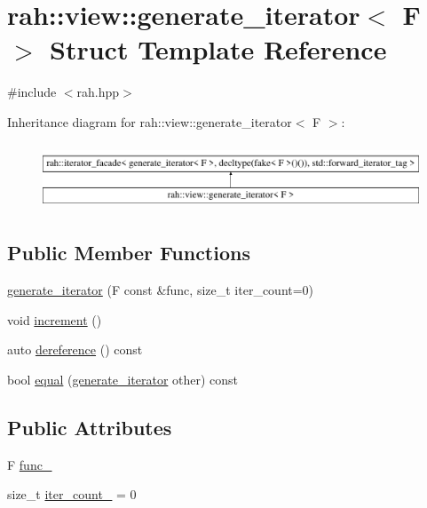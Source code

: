 \hypertarget{structrah_1_1view_1_1generate__iterator}{}\section{rah\+::view\+::generate\+\_\+iterator$<$ F $>$ Struct Template Reference}
\label{structrah_1_1view_1_1generate__iterator}


{\ttfamily \#include $<$rah.\+hpp$>$}

Inheritance diagram for rah\+::view\+::generate\+\_\+iterator$<$ F $>$\+:\begin{figure}[H]
\begin{center}
\leavevmode
\includegraphics[height=1.975309cm]{structrah_1_1view_1_1generate__iterator}
\end{center}
\end{figure}
\subsection*{Public Member Functions}
\begin{DoxyCompactItemize}
\item 
\mbox{\hyperlink{structrah_1_1view_1_1generate__iterator_af458a280a6089691435a8ad71380fca9}{generate\+\_\+iterator}} (F const \&func, size\+\_\+t iter\+\_\+count=0)
\item 
void \mbox{\hyperlink{structrah_1_1view_1_1generate__iterator_aeb0fc0db74bda811fe5d7cb8c6efe1e0}{increment}} ()
\item 
auto \mbox{\hyperlink{structrah_1_1view_1_1generate__iterator_ab7b0cf4a8f45cfd67278935bd9a39c13}{dereference}} () const
\item 
bool \mbox{\hyperlink{structrah_1_1view_1_1generate__iterator_a8cd374b2e2f6f9e9d3fc841140000f57}{equal}} (\mbox{\hyperlink{structrah_1_1view_1_1generate__iterator}{generate\+\_\+iterator}} other) const
\end{DoxyCompactItemize}
\subsection*{Public Attributes}
\begin{DoxyCompactItemize}
\item 
F \mbox{\hyperlink{structrah_1_1view_1_1generate__iterator_a72f19774c5fddd0a04a293bd08dce1cd}{func\+\_\+}}
\item 
size\+\_\+t \mbox{\hyperlink{structrah_1_1view_1_1generate__iterator_a66d7843d9aefee7179023c5c13fa05c1}{iter\+\_\+count\+\_\+}} = 0
\end{DoxyCompactItemize}


